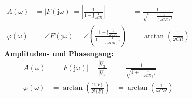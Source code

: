 \begin{frame}
\begin{columns}
{                \begin{align}
                    A(\omega)       &= |\underline{F}(\mathrm{j}\omega)| = \left|\frac{1}{1-\mathrm{j}\frac{1}{\omega CR}}\right|
                                    &= \frac{1}{\sqrt{1 + \frac{1}{(\omega CR)^2}}} \label{eq:hochpass:ampli}\\
                    \varphi(\omega) &= \angle \underline{F}(\mathrm{j}\omega) = \angle\left(\frac{1 + \mathrm{j}\frac{1}{\omega CR}}{1 + \frac{1}{(\omega CR)^2}}\right)
                                    &= \arctan\left(\frac{1}{\omega CR}\right)\label{eq:hochpass:phase}
                \end{align}
            }%
            \b{%
                \textbf{Amplituden- und Phasengang:}
                \begin{align} %
                    A(\omega)       &= |\underline{F}(\mathrm{j}\omega)| = \frac{|\underline{U}_2|}{|\underline{U}_1|}
                                    &= \frac{1}{\sqrt{1 + \frac{1}{(\omega CR)^2}}} \\
                    \varphi(\omega) &= \arctan\left(\frac{\Im\{\underline{F}\}}{\Re\{\underline{F}\}}\right)
                                    &= \arctan\left(\frac{1}{\omega CR}\right)\\
                \end{align}
            }%
    \end{columns}
\end{frame}


